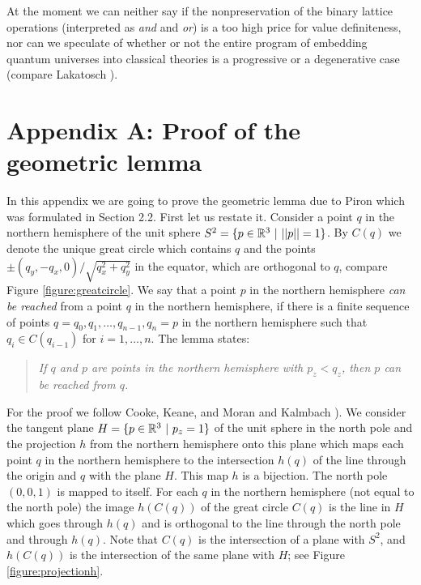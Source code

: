 At the moment we can neither say if the nonpreservation of the binary
lattice operations (interpreted as {\it and} and {\it or}) is a
too high price for value definiteness, nor can we speculate of whether
or not the entire program of embedding quantum universes into classical
theories is a progressive or a degenerative case (compare Lakatosch
\cite{lakatosch}).


\appendix
\section*{Appendix A: Proof of the geometric lemma}

In this appendix we are going to prove the geometric lemma
due to Piron \cite{piron-76} which was formulated in Section 2.2.
First let us restate it. Consider a point $q$ in the northern hemisphere
of the unit sphere $S^2 = \{p \in {\Bbb R}^3 \ | \ ||p||=1\}$. By
$C(q)$ we denote the unique
great circle which contains $q$ and the points
$\pm(q_y,-q_x,0)/\sqrt{q_x^2+q_y^2}$ in the equator, which are orthogonal
to $q$, compare Figure \ref{figure:greatcircle}.
We say that a point $p$ in the northern hemisphere {\em can be reached}
from a point $q$ in the
northern hemisphere, if there is a finite
sequence of points $q=q_0, q_1, \ldots, q_{n-1}, q_n=p$
in the northern hemisphere such that $q_i\in C(q_{i-1})$
for $i=1,\ldots,n$. The lemma states:
\begin{quote}
{\it If $q$ and $p$ are points in the northern hemisphere
with $p_z < q_z$, then $p$ can be reached from $q$.}
\end{quote}
For the proof we follow
Cooke, Keane, and Moran \cite{c-k-m} and Kalmbach \cite{kalmbach-86}).
We consider the
tangent plane $H=\{p \in {\Bbb R}^3\ | \ p_z=1\}$ of the unit sphere
in the north pole  and the projection $h$ from the northern hemisphere
onto this plane which maps each point
$q$ in the northern hemisphere to the intersection $h(q)$
of the line
through the origin and $q$ with the plane $H$.
This map $h$ is a bijection.
The north pole $(0,0,1)$ is mapped
to itself. For each $q$
in the northern
hemisphere (not equal to the north pole)
the image $h(C(q))$ of the
great
circle $C(q)$ is the line in $H$ which goes through $h(q)$
and is
orthogonal to the line through the north pole  and
through $h(q)$.
Note
that $C(q)$ is the intersection of a plane with $S^2$, and
$h(C(q))$ is the
intersection of the same plane with $H$;
see Figure
\ref{figure:projectionh}.
%
